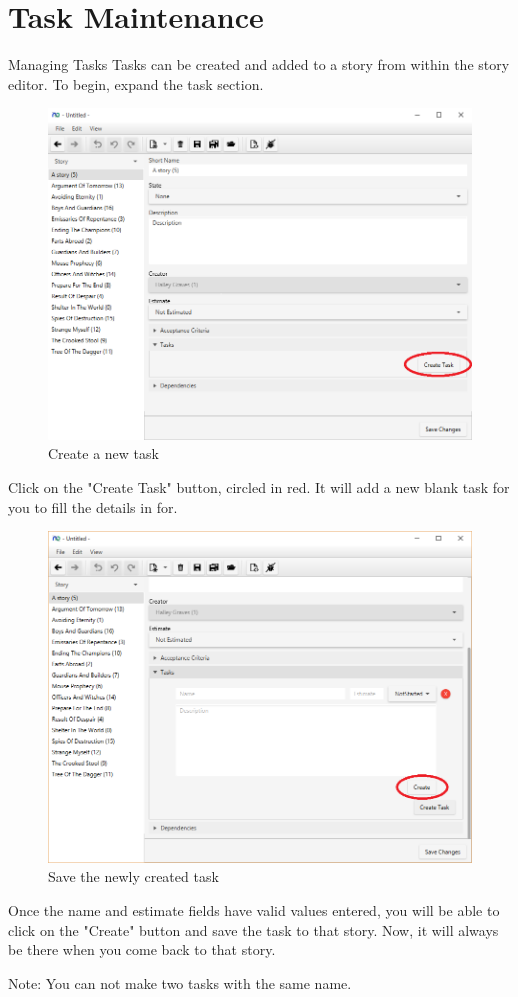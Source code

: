 \section{Task Maintenance}

Managing Tasks
\newline
Tasks can be created and added to a story from within the story editor. To begin, expand the task section.

\begin{figure}[H]
\centering
\includegraphics[width=\textwidth]{images/screenshots/task_1.png}
\caption{Create a new task}
\label{fig:new_project}
\end{figure}

Click on the "Create Task" button, circled in red. It will add a new blank task for you to fill the details in for.

\begin{figure}[H]
\centering
\includegraphics[width=\textwidth]{images/screenshots/task_2.png}
\caption{Save the newly created task}
\label{fig:new_project}
\end{figure}

Once the name and estimate fields have valid values entered, you will be able to click on the "Create" button and save the task to that story. Now, it will always be there when you come back to that story.

\newline

Note:
\newline
You can not make two tasks with the same name.
